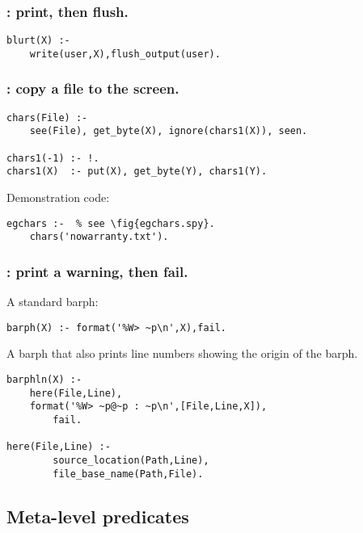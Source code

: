 \subsubsection{ : print, then flush.
}
\begin{Verbatim}
blurt(X) :- 
    write(user,X),flush_output(user).
\end{Verbatim}
\subsubsection{ : copy a file to the screen.
}
\label{sec:chars/1}
\begin{Verbatim}
chars(File) :- 
    see(File), get_byte(X), ignore(chars1(X)), seen.
    
chars1(-1) :- !.
chars1(X)  :- put(X), get_byte(Y), chars1(Y).
\end{Verbatim}
Demonstration code:
\begin{Verbatim}
egchars :-  % see \fig{egchars.spy}.
    chars('nowarranty.txt').
\end{Verbatim}
\subsubsection{ : print a warning, then fail.
}
A standard barph:
\begin{Verbatim}
barph(X) :- format('%W> ~p\n',X),fail.
\end{Verbatim}
 A barph that also prints line numbers showing
 the origin of the barph. 
\begin{Verbatim}
barphln(X) :-
    here(File,Line),
    format('%W> ~p@~p : ~p\n',[File,Line,X]),
        fail. 

here(File,Line) :-
        source_location(Path,Line),
        file_base_name(Path,File).
\end{Verbatim}        
\subsection{ Meta-level predicates
}
